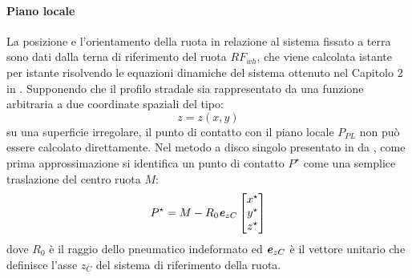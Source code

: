 \paragraph{Piano locale}
La posizione e l'orientamento della ruota in relazione al sistema fissato a terra sono dati dalla terna di riferimento del ruota $RF_{wh}$, che viene calcolata istante per istante risolvendo le equazioni dinamiche del sistema ottenuto nel Capitolo 2 in \cite{Larcher}. Supponendo che il profilo stradale sia rappresentato da una funzione arbitraria a due coordinate spaziali del tipo: 
%
\begin{equation}
z=z(x,y)
\end{equation}
%
su una superficie irregolare, il punto di contatto con il piano locale $P_{PL}$ non può essere calcolato direttamente. Nel metodo a disco singolo presentato in \cite{Rill} da \citeauthor{Rill}, come prima approssimazione si identifica un punto di contatto $P^\star$ come una semplice traslazione del centro ruota $M$:
%
\begin{equation}
P^\star = M-R_0\textbf{\textit{e}}_{zC}
\begin{bmatrix}
x^\star\\
y^\star\\
z^\star
\end{bmatrix}
\end{equation}
%
dove $R_0$ è il raggio dello pneumatico indeformato ed $\textbf{\textit{e}}_{zC}$ è il vettore unitario che definisce l'asse $z_C$ del sistema di riferimento della ruota.


